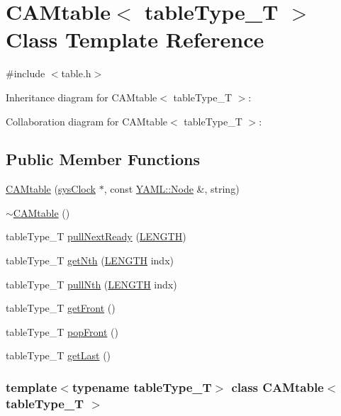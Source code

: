 \hypertarget{classCAMtable}{
\section{CAMtable$<$ tableType\_\-T $>$ Class Template Reference}
\label{classCAMtable}
}


{\ttfamily \#include $<$table.h$>$}



Inheritance diagram for CAMtable$<$ tableType\_\-T $>$:


Collaboration diagram for CAMtable$<$ tableType\_\-T $>$:
\subsection*{Public Member Functions}
\begin{DoxyCompactItemize}
\item 
\hyperlink{classCAMtable_a11e9beacdac67a01e521e468f38ced59}{CAMtable} (\hyperlink{classsysClock}{sysClock} $\ast$, const \hyperlink{classYAML_1_1Node}{YAML::Node} \&, string)
\item 
\hyperlink{classCAMtable_a5d8003f0fb86c270c65674efa53b1172}{$\sim$CAMtable} ()
\item 
tableType\_\-T \hyperlink{classCAMtable_a07cd94cd88b502e5b0e2699b8762f560}{pullNextReady} (\hyperlink{binaryTranslator_2global_8h_a9f35cc405c37836572563f16d0302ba6}{LENGTH})
\item 
tableType\_\-T \hyperlink{classCAMtable_abef54f1e30ed42845d48c98917de32e1}{getNth} (\hyperlink{binaryTranslator_2global_8h_a9f35cc405c37836572563f16d0302ba6}{LENGTH} indx)
\item 
tableType\_\-T \hyperlink{classCAMtable_a9644548c43e912d1cd1d0431fc5179e9}{pullNth} (\hyperlink{binaryTranslator_2global_8h_a9f35cc405c37836572563f16d0302ba6}{LENGTH} indx)
\item 
tableType\_\-T \hyperlink{classCAMtable_a1111b552094db836302ac5ce0671794a}{getFront} ()
\item 
tableType\_\-T \hyperlink{classCAMtable_a5e19b284c54893d488fb7eae5f84aa13}{popFront} ()
\item 
tableType\_\-T \hyperlink{classCAMtable_a0bc1956b7e4c93f753232e42241162e5}{getLast} ()
\end{DoxyCompactItemize}
\subsubsection*{template$<$typename tableType\_\-T$>$ class CAMtable$<$ tableType\_\-T $>$}



